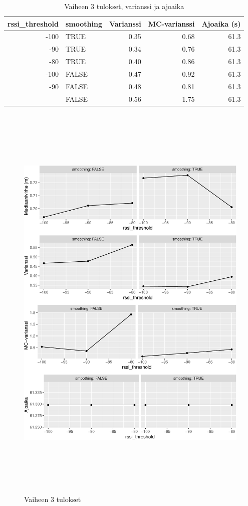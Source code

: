\documentclass[
  12pt,
  a4paper, twoside]{book}
\begin{document}
\begin{table}

\caption{\label{tab:vaihe-3-tulokset-varianssi}Vaiheen 3 tulokset, varianssi ja ajoaika}
\centering
\begin{tabular}[t]{rlrrr}
\toprule
rssi\_threshold & smoothing & Varianssi & MC-varianssi & Ajoaika (s)\\
\midrule
-100 & TRUE & 0.35 & 0.68 & 61.3\\
-90 & TRUE & 0.34 & 0.76 & 61.3\\
-80 & TRUE & 0.40 & 0.86 & 61.3\\
-100 & FALSE & 0.47 & 0.92 & 61.3\\
-90 & FALSE & 0.48 & 0.81 & 61.3\\
\addlinespace
-80 & FALSE & 0.56 & 1.75 & 61.3\\
\bottomrule
\end{tabular}
\end{table}

\clearpage

\begin{figure}

{\centering \includegraphics[width=15cm,height=20cm]{output/figures/phase3-results-1} 

}

\caption{Vaiheen 3 tulokset}\label{fig:phase3-results}
\end{figure}
\end{document}
